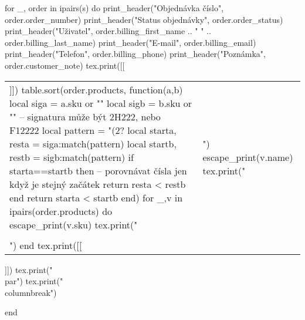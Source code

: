 \documentclass[landscape,a4page]{article}
\begin{document}
\begin{multicols*}{3}
\begin{luacode*}
for _, order in ipairs(s) do
  print_header("Objednávka číslo", order.order_number)
  print_header("Status objednávky", order.order_status)
  print_header("Uživatel", order.billing_first_name .. " " .. order.billing_last_name)
  print_header("E-mail", order.billing_email)
  print_header("Telefon", order.billing_phone)
  print_header("Poznámka", order.customer_note)
  tex.print([[
  \bigskip
  \begin{tabular}{p{.2\linewidth}p{.5\linewidth}}]])
  table.sort(order.products, function(a,b)
    local siga = a.sku or ""
    local sigb = b.sku or ""
    -- signatura může být 2H222, nebo F12222
    local pattern = "(2?%
    local starta, resta = siga:match(pattern)
    local startb, restb = sigb:match(pattern)
    if starta==startb then
      -- porovnávat čísla jen když je stejný začátek
      return resta < restb 
    end
    return starta < startb
  end)
  for _,v in ipairs(order.products) do
    escape_print(v.sku)
    tex.print("&")
    escape_print(v.name)
    tex.print("\\\\")
  end
  tex.print([[
  \end{tabular}

  \vfill
  \null
   
  ]])
  tex.print("\\par")
  tex.print("\\columnbreak")

end



\end{luacode*}
\end{multicols*}
\end{document}
